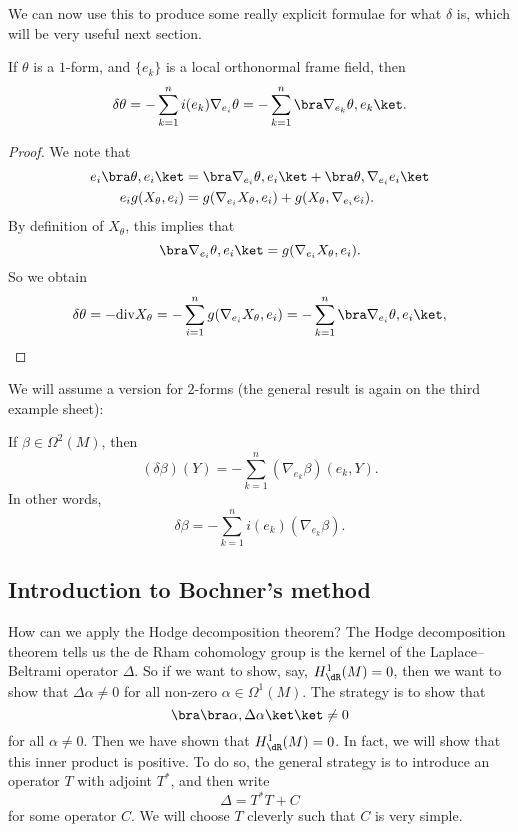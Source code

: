 \documentclass[a4paper]{article}
\renewcommand\div{\mathrm{div}}
\begin{document}
We can now use this to produce some really explicit formulae for what $\delta$ is, which will be very useful next section.
\begin{cor}
  If $\theta$ is a $1$-form, and $\{e_k\}$ is a local orthonormal frame field, then
  \[
    \delta \theta = - \sum_{k = 1}^n i(e_k) \nabla_{e_i} \theta = - \sum_{k = 1}^n \bra \nabla_{e_k} \theta, e_k\ket.
  \]
\end{cor}

\begin{proof}
  We note that
  \begin{align*}
    e_i \bra \theta, e_i\ket &= \bra \nabla_{e_i} \theta, e_i\ket + \bra \theta, \nabla_{e_i}e_i\ket\\
    e_i g(X_\theta, e_i) &= g(\nabla_{e_i} X_\theta, e_i) + g(X_\theta, \nabla_{e_i}e_i).
  \end{align*}
  By definition of $X_\theta$, this implies that
  \[
    \bra \nabla_{e_i} \theta, e_i\ket = g(\nabla_{e_i} X_\theta, e_i).
  \]
  So we obtain
  \[
    \delta \theta = - \div X_\theta = -\sum_{i = 1}^n g(\nabla_{e_i} X_\theta, e_i) = - \sum_{k = 1}^n \bra \nabla_{e_i} \theta, e_i\ket,
  \]
\end{proof}

We will assume a version for $2$-forms (the general result is again on the third example sheet):
\begin{prop}
  If $\beta \in \Omega^2(M)$, then
  \[
    (\delta \beta)(Y) = - \sum_{k = 1}^n (\nabla_{e_k} \beta)(e_k, Y).
  \]
  In other words,
  \[
    \delta \beta = - \sum_{k = 1}^n i(e_k) (\nabla_{e_k}\beta).
  \]
\end{prop}

\subsection{Introduction to Bochner's method}
How can we apply the Hodge decomposition theorem? The Hodge decomposition theorem tells us the de Rham cohomology group is the kernel of the Laplace--Beltrami operator $\Delta$. So if we want to show, say, $H^1_{\dR}(M) = 0$, then we want to show that $\Delta \alpha \not= 0$ for all non-zero $\alpha \in \Omega^1(M)$. The strategy is to show that
\[
  \bra \bra \alpha, \Delta \alpha\ket\ket \not= 0
\]
for all $\alpha \not= 0$. Then we have shown that $H^1_{\dR}(M) = 0$. In fact, we will show that this inner product is positive. To do so, the general strategy is to introduce an operator $T$ with adjoint $T^*$, and then write
\[
  \Delta = T^* T + C
\]
for some operator $C$. We will choose $T$ cleverly such that $C$ is very simple.
\end{document}
